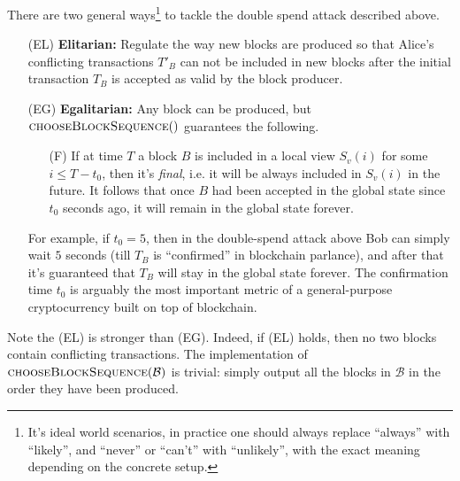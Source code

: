 \documentclass[a4paper]{article}
\begin{document}
  There are two general ways\footnote{It's ideal world scenarios, in practice one should always replace ``always'' with ``likely'', and ``never'' or ``can't'' with ``unlikely'', with the exact meaning depending on the concrete setup.} to tackle the double spend attack described above.
  \begin{enumerate}
     \item[(EL)] {\bf Elitarian:} Regulate the way new blocks are produced so that Alice's conflicting transactions $T'_B$ can not be included in new blocks after the initial transaction $T_B$ is accepted as valid by the block producer.
     
     \item[(EG)] {\bf Egalitarian:} Any block can be produced, but  $\Call{chooseBlockSequence}$ guarantees the following.
   \begin{itemize}  
     \item[(F)] If at time $T$ a block $B$ is included in a local view $S_v(i)$ for some $i \leq T - t_0$, then it's \emph{final}, i.e. it will be always included in $S_v(i)$ in the future. It follows that once $B$ had been accepted in the global state since $t_0$ seconds ago, it will remain in the global state forever. 
   \end{itemize}  
     
     For example, if $t_0 = 5$, then in the double-spend attack above Bob can simply wait $5$ seconds (till $T_B$ is ``confirmed'' in blockchain parlance), and after that it's guaranteed that $T_B$ will stay in the global state forever. The confirmation time $t_0$ is arguably the most important metric of a general-purpose cryptocurrency built on top of blockchain. 
  \end{enumerate}
  
  
Note the (EL) is stronger than (EG). Indeed, if (EL) holds, then no two blocks contain conflicting transactions. The implementation of $\Call{chooseBlockSequence}{\mathcal{B}}$ is trivial:
simply output all the blocks in $\mathcal{B}$ in the order they have been produced. 
\end{document}
